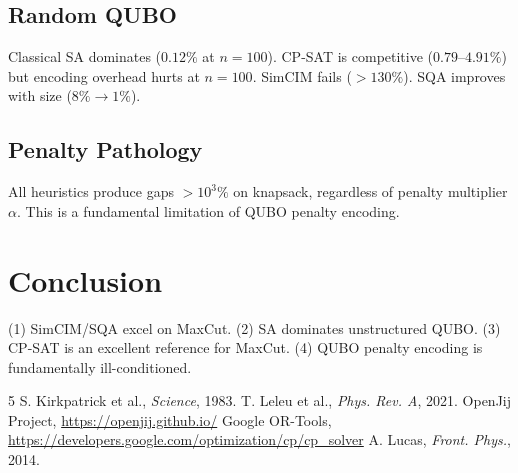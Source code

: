 \documentclass[10pt,twocolumn]{article}
\begin{document}
\subsection*{Random QUBO}
Classical SA dominates ($0.12\%$ at $n=100$). CP-SAT is competitive ($0.79$--$4.91\%$) but encoding overhead hurts at $n=100$. SimCIM fails ($>130\%$). SQA improves with size ($8\%\to1\%$).

\subsection*{Penalty Pathology}
All heuristics produce gaps $>10^3\%$ on knapsack, regardless of penalty multiplier $\alpha$. This is a fundamental limitation of QUBO penalty encoding.

\section{Conclusion}
(1) SimCIM/SQA excel on MaxCut. (2) SA dominates unstructured QUBO. (3) CP-SAT is an excellent reference for MaxCut. (4) QUBO penalty encoding is fundamentally ill-conditioned.

\begin{thebibliography}{5}
 S. Kirkpatrick et al., \emph{Science}, 1983.
 T. Leleu et al., \emph{Phys. Rev. A}, 2021.
 OpenJij Project, \url{https://openjij.github.io/}
 Google OR-Tools, \url{https://developers.google.com/optimization/cp/cp_solver}
 A. Lucas, \emph{Front. Phys.}, 2014.
\end{thebibliography}
\end{document}
